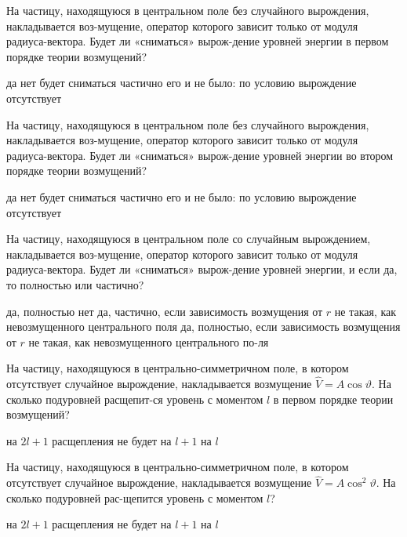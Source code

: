 \documentclass[11pt,a4paper]{exam}
\begin{document}
\begin{questions}
\question На частицу, находящуюся в центральном поле без случайного вырождения, накладывается воз-мущение, оператор которого зависит только от модуля радиуса-вектора. Будет ли «сниматься» вырож-дение уровней энергии в первом порядке теории возмущений?
\begin{choices}
\choice да             
\choice нет
\choice будет сниматься частично   
\choice его и не было: по условию вырождение отсутствует
\end{choices}

\question На частицу, находящуюся в центральном поле без случайного вырождения, накладывается воз-мущение, оператор которого зависит только от модуля радиуса-вектора. Будет ли «сниматься» вырож-дение уровней энергии во втором порядке теории возмущений?
\begin{choices}
\choice да             
\choice нет
\choice будет сниматься частично   
\choice его и не было: по условию вырождение отсутствует
\end{choices}

\question На частицу, находящуюся в центральном поле со случайным вырождением, накладывается воз-мущение, оператор которого зависит только от модуля радиуса-вектора. Будет ли «сниматься» вырож-дение уровней энергии, и если да, то полностью или частично?
\begin{choices}
\choice да, полностью
\choice нет
\choice да, частично, если зависимость возмущения от $r$ не такая, как невозмущенного центрального поля
\choice да, полностью, если зависимость возмущения от $r$ не такая, как невозмущенного центрального по-ля
\end{choices}

\question На частицу, находящуюся в центрально-симметричном поле, в котором отсутствует случайное вырождение, накладывается возмущение $\hat V = A\cos \vartheta $. На сколько подуровней расщепит-ся уровень с моментом $l$ в первом порядке теории возмущений?
\begin{choices}
\choice на $2l + 1$    
\choice расщепления не будет    
\choice на $l + 1$     
\choice на $l$
\end{choices}

\question На частицу, находящуюся в центрально-симметричном поле, в котором отсутствует случайное вырождение, накладывается возмущение $\hat V = A{\cos ^2}\vartheta $. На сколько подуровней рас-щепится уровень с моментом $l$?
\begin{choices}
\choice на $2l + 1$    
\choice расщепления не будет    
\choice на $l + 1$     
\choice на $l$
\end{choices}


\end{questions}
\end{document}
